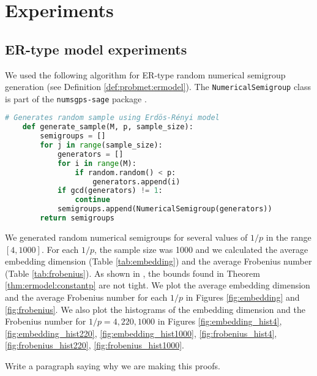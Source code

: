 

\chapter{Experiments}\label{chap:experiments}

\section{ER-type model experiments}

We used the following algorithm for ER-type random numerical semigroup generation (see Definition \ref{def:probmet:ermodel}). The \verb|NumericalSemigroup| class is part of the \verb|numsgps-sage| package \cite{oneill2018}. 

\begin{lstlisting}[language=Python]
    # Generates random sample using Erdös-Rényi model 
    def generate_sample(M, p, sample_size):
        semigroups = []
        for j in range(sample_size):
            generators = []
            for i in range(M):
                if random.random() < p:
                    generators.append(i)
            if gcd(generators) != 1:
                continue
            semigroups.append(NumericalSemigroup(generators))
        return semigroups
\end{lstlisting}
We generated random numerical semigroups for several values of $1/p$ in the range $[4, 1000]$. For each $1/p$, the sample size was 1000 and we calculated the average embedding dimension (Table \ref{tab:embedding}) and the average Frobenius number (Table \ref{tab:frobenius}). As shown in \cite{de2018random}, the bounds found in Theorem \ref{thm:ermodel:constantp} are not tight. We plot the average embedding dimension and the average Frobenius number for each $1/p$ in Figures \ref{fig:embedding} and \ref{fig:frobenius}. We also plot the histograms of the embedding dimension and the Frobenius number for $1/p = 4, 220, 1000$ in Figures \ref{fig:embedding_hist4}, \ref{fig:embedding_hist220}, \ref{fig:embedding_hist1000}, \ref{fig:frobenius_hist4}, \ref{fig:frobenius_hist220}, \ref{fig:frobenius_hist1000}. \par
Write a paragraph saying why we are making this proofs. 


